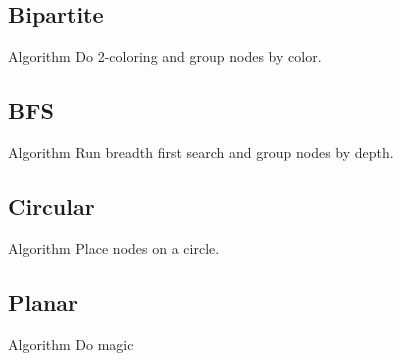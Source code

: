 \documentclass[11pt]{beamer}
\begin{document}
\subsection{Bipartite}
\begin{frame}{\subsecname}

    \begin{block}{Algorithm}
        Do 2-coloring and group nodes by color.
    \end{block}

    \pause
    \resizebox{0.8\textwidth}{!}{}
\end{frame}

\subsection{BFS}
\begin{frame}{\subsecname}

    \begin{block}{Algorithm}
        Run breadth first search and group nodes by depth.\\
    \end{block}

    \pause
    \resizebox{0.8\textwidth}{!}{}

\end{frame}

\subsection{Circular}
\begin{frame}{\subsecname}
    \begin{block}{Algorithm}
        Place nodes on a circle.
    \end{block}

    \pause
    \resizebox{0.8\textwidth}{!}{}
\end{frame}

\subsection{Planar}
\begin{frame}{\subsecname}
    \begin{block}{Algorithm}
        Do magic
    \end{block}

    \pause
    \resizebox{0.8\textwidth}{!}{}
\end{frame}
\end{document}
